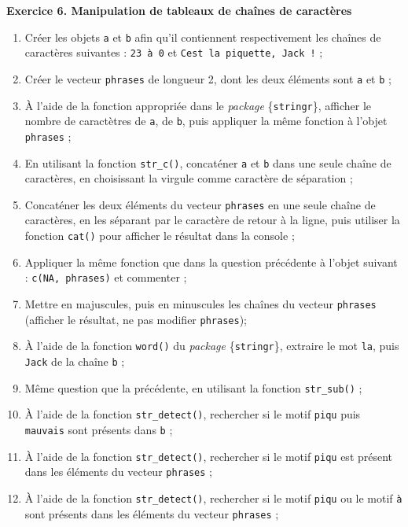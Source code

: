 \documentclass[
  11pt,
]{book}
\makeatletter
\providecommand{\tightlist}{%
  \setlength{\itemsep}{0pt}\setlength{\parskip}{0pt}}
\numberwithin{equation}{section}
\numberwithin{countremarque}{section}
\newenvironment{exframe}{%
 \def\at@end@of@exframe{}%
 \ifinner\ifhmode%
  \def\at@end@of@exframe{\end{minipage}}%
  \begin{minipage}{\columnwidth}%
 \fi\fi%
 \def\FrameCommand##1{\hskip\@totalleftmargin \hskip-\fboxsep
 \colorbox{shadecolorex}{##1}\hskip-\fboxsep
     \hskip-\linewidth \hskip-\@totalleftmargin \hskip\columnwidth}%
 \MakeFramed {\advance\hsize-\width
   \@totalleftmargin\z@ \linewidth\hsize
   \@setminipage}}%
 {\par\unskip\endMakeFramed%
 \at@end@of@exframe}
\makeatother
\begin{document}
\begin{exframe}
\textbf{Exercice 6. Manipulation de tableaux de chaînes de caractères}

\begin{enumerate}
\def\labelenumi{\arabic{enumi}.}
\tightlist
\item
  Créer les objets \texttt{a} et \texttt{b} afin qu'il contiennent respectivement les chaînes de caractères suivantes : \texttt{23\ à\ 0} et \texttt{C\textquotesingle{}est\ la\ piquette,\ Jack\ !} ;
\item
  Créer le vecteur \texttt{phrases} de longueur 2, dont les deux éléments sont \texttt{a} et \texttt{b} ;
\item
  À l'aide de la fonction appropriée dans le \emph{package} \{\texttt{stringr}\}, afficher le nombre de caractètres de \texttt{a}, de \texttt{b}, puis appliquer la même fonction à l'objet \texttt{phrases} ;
\item
  En utilisant la fonction \texttt{str\_c()}, concaténer \texttt{a} et \texttt{b} dans une seule chaîne de caractères, en choisissant la virgule comme caractère de séparation ;
\item
  Concaténer les deux éléments du vecteur \texttt{phrases} en une seule chaîne de caractères, en les séparant par le caractère de retour à la ligne, puis utiliser la fonction \texttt{cat()} pour afficher le résultat dans la console ;
\item
  Appliquer la même fonction que dans la question précédente à l'objet suivant : \texttt{c(NA,\ phrases)} et commenter ;
\item
  Mettre en majuscules, puis en minuscules les chaînes du vecteur \texttt{phrases} (afficher le résultat, ne pas modifier \texttt{phrases});
\item
  À l'aide de la fonction \texttt{word()} du \emph{package} \{\texttt{stringr}\}, extraire le mot \texttt{la}, puis \texttt{Jack} de la chaîne \texttt{b} ;
\item
  Même question que la précédente, en utilisant la fonction \texttt{str\_sub()} ;
\item
  À l'aide de la fonction \texttt{str\_detect()}, rechercher si le motif \texttt{piqu} puis \texttt{mauvais} sont présents dans \texttt{b} ;
\item
  À l'aide de la fonction \texttt{str\_detect()}, rechercher si le motif \texttt{piqu} est présent dans les éléments du vecteur \texttt{phrases} ;
\item
  À l'aide de la fonction \texttt{str\_detect()}, rechercher si le motif \texttt{piqu} ou le motif \texttt{à} sont présents dans les éléments du vecteur \texttt{phrases} ;

\end{enumerate}
\end{exframe}
\end{document}
